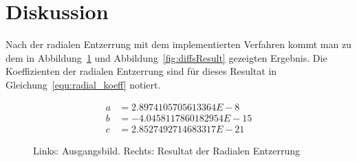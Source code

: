 
\section{Diskussion}
\label{sec:Auswertung}

Nach der radialen Entzerrung mit dem implementierten Verfahren kommt man zu dem in Abbildung~\ref{fig:Ergebnis} und Abbildung~\ref{fig:diffsResult} gezeigten Ergebnis. Die Koeffizienten der radialen Entzerrung sind für dieses Resultat in Gleichung~\ref{equ:radial_koeff} notiert. 

\begin{align}
a &=  2.8974105705613364E-8 \nonumber \\
b &= -4.0458117860182954E-15 \nonumber \\
c &=  2.8527492714683317E-21
\label{equ:radial_koeff}
\end{align}

\begin{figure}[H]
	\caption{Links: Ausgangsbild. Rechts: Resultat der Radialen Entzerrung}
	\label{fig:Ergebnis}
\end{figure}
	
